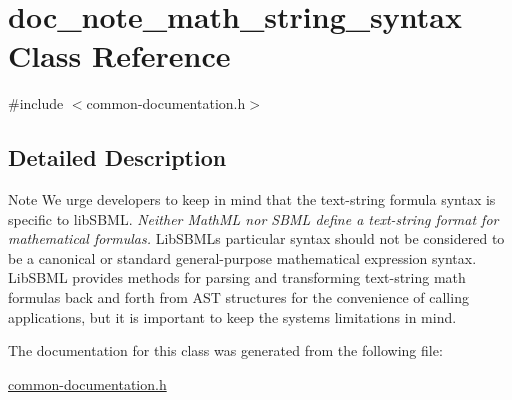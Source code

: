 \hypertarget{classdoc__note__math__string__syntax}{}\section{doc\+\_\+note\+\_\+math\+\_\+string\+\_\+syntax Class Reference}
\label{classdoc__note__math__string__syntax}


{\ttfamily \#include $<$common-\/documentation.\+h$>$}



\subsection{Detailed Description}
\begin{DoxyNote}{Note}
We urge developers to keep in mind that the text-\/string formula syntax is specific to lib\+S\+B\+ML. {\itshape Neither Math\+ML nor S\+B\+ML define a text-\/string format for mathematical formulas.} Lib\+S\+B\+ML\textquotesingle{}s particular syntax should not be considered to be a canonical or standard general-\/purpose mathematical expression syntax. Lib\+S\+B\+ML provides methods for parsing and transforming text-\/string math formulas back and forth from A\+ST structures for the convenience of calling applications, but it is important to keep the system\textquotesingle{}s limitations in mind. 
\end{DoxyNote}


The documentation for this class was generated from the following file\+:\begin{DoxyCompactItemize}
\item 
\hyperlink{common-documentation_8h}{common-\/documentation.\+h}\end{DoxyCompactItemize}
